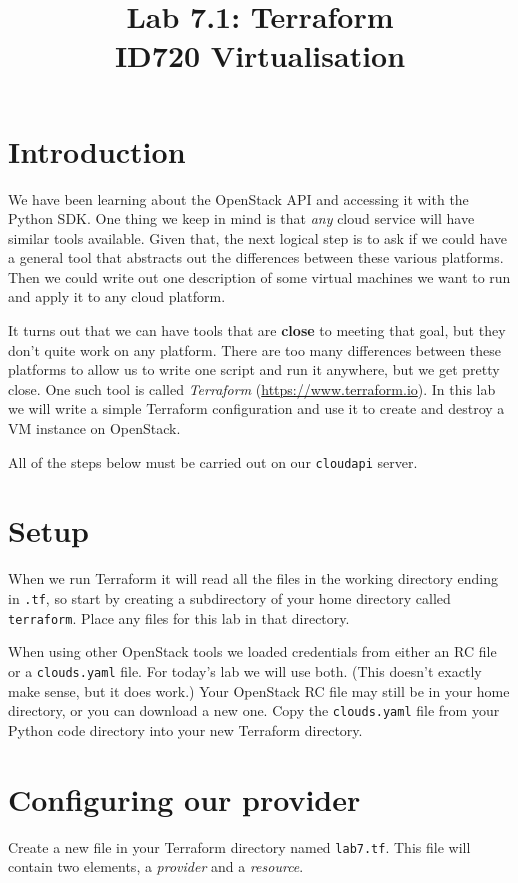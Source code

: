 \documentclass{article}
\begin{document}
\title{Lab 7.1: Terraform \\ ID720 Virtualisation}
\date{}
\maketitle

\section*{Introduction}
We have been learning about the OpenStack API and accessing it with the 
Python SDK. One thing we keep in mind is that \emph{any} cloud service 
will have similar tools available. Given that, the next logical step is
to ask if we could have a general tool that abstracts out the differences
between these various platforms. Then we could write out one description of
some virtual machines we want to run and apply it to any cloud platform.

It turns out that we can have tools that are \textbf{close} to meeting that
goal, but they don't quite work on any platform. There are too many differences
between these platforms to allow us to write one script and run it anywhere, 
but we get pretty close. One such tool is called \emph{Terraform} 
(\url{https://www.terraform.io}). In this lab we will write a simple Terraform
configuration and use it to create and destroy a VM instance on OpenStack.

All of the steps below must be carried out on our \texttt{cloudapi} server.

\section{Setup}
When we run Terraform it will read all the files in the working directory
ending in \texttt{.tf}, so start by creating a subdirectory of your home 
directory called \texttt{terraform}. Place any files for this lab in that 
directory.

When using other OpenStack tools we loaded credentials from either an
RC file or a \texttt{clouds.yaml} file. For today's lab we will use
both. (This doesn't exactly make sense, but it does work.) Your OpenStack RC file 
may still be in your home directory, or you can download a new one. Copy the 
\texttt{clouds.yaml} file from your Python code directory into your new Terraform 
directory.

\section{Configuring our provider}
Create a new file in your Terraform directory named \texttt{lab7.tf}. This file 
will contain two elements, a \emph{provider} and a \emph{resource}.
\end{document}
